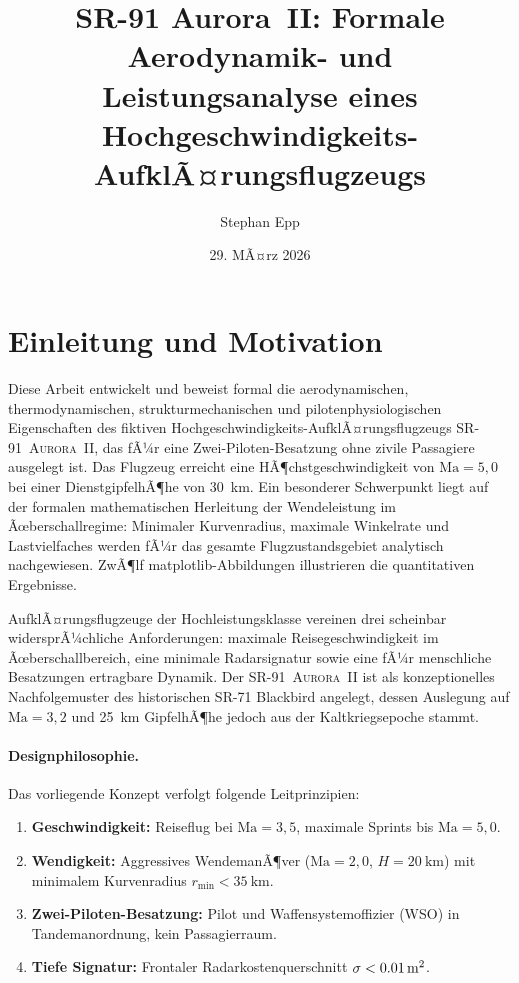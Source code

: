 ﻿\documentclass[12pt,a4paper]{article}
\title{\textbf{SR-91 Aurora~II:	Formale Aerodynamik- und Leistungsanalyse
	eines Hochgeschwindigkeits-AufklÃ¤rungsflugzeugs}}
\author{Stephan Epp}
\date{29. MÃ¤rz 2026}
\theoremstyle{plain}
\theoremstyle{definition}
\theoremstyle{remark}
\newcommand{\SR}{\textsc{SR-91~Aurora~II}}
\newcommand{\Mach}[1]{$\mathrm{Ma} = #1$}
\begin{document}
\maketitle
\tableofcontents
\newpage

\section{Einleitung und Motivation}

Diese Arbeit entwickelt und beweist formal die aerodynamischen, thermodynamischen,
strukturmechanischen und pilotenphysiologischen Eigenschaften des fiktiven
Hochgeschwin\-digkeits-AufklÃ¤rungsflugzeugs \SR{}, das fÃ¼r eine Zwei-Piloten-Besatzung
ohne zivile Passagiere ausgelegt ist.
Das Flugzeug erreicht eine HÃ¶chstgeschwindigkeit von \Mach{5{,}0} bei einer
DienstgipfelhÃ¶he von \SI{30}{\kilo\metre}.
Ein besonderer Schwerpunkt liegt auf der formalen mathematischen Herleitung der
Wendeleistung im Ãœberschallregime:
Minimaler Kurvenradius, maximale Winkelrate und Lastvielfaches werden fÃ¼r das
gesamte Flugzustandsgebiet analytisch nachgewiesen.
ZwÃ¶lf matplotlib-Abbildungen illustrieren die quantitativen Ergebnisse.

AufklÃ¤rungsflugzeuge der Hochleistungsklasse vereinen drei scheinbar widersprÃ¼chliche
Anforderungen: maximale Reisegeschwindigkeit im Ãœberschallbereich, eine minimale
Radarsignatur sowie eine fÃ¼r menschliche Besatzungen ertragbare Dynamik.
Der \SR{} ist als konzeptionelles Nachfolgemuster des historischen SR-71 Blackbird
angelegt, dessen Auslegung auf \Mach{3{,}2} und \SI{25}{\kilo\metre} GipfelhÃ¶he
jedoch aus der Kaltkriegsepoche stammt.

\paragraph{Designphilosophie.}
Das vorliegende Konzept verfolgt folgende Leitprinzipien:
\begin{enumerate}[label=\roman*.]
  \item \textbf{Geschwindigkeit:} Reiseflug bei \Mach{3{,}5}, maximale Sprints bis \Mach{5{,}0}.
  \item \textbf{Wendigkeit:} Aggressives WendemanÃ¶ver (\Mach{2{,}0}, $H = \SI{20}{\kilo\metre}$)
        mit minimalem Kurvenradius $r_{\min} < \SI{35}{\kilo\metre}$.
  \item \textbf{Zwei-Piloten-Besatzung:} Pilot und Waffensystemoffizier (WSO) in
        Tandemanordnung, kein Passagierraum.
  \item \textbf{Tiefe Signatur:} Frontaler Radarkostenquerschnitt $\sigma < \SI{0{,}01}{\metre\squared}$.
\end{enumerate}
\end{document}
